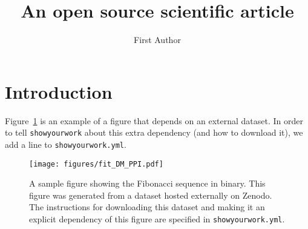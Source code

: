 \documentclass[twocolumn]{aastex631}
\begin{document}
\title{An open source scientific article}

\author{First Author}

\begin{abstract}
    \blindtext
\end{abstract}

\section{Introduction}

Figure~\ref{fig:fit_DM_PPI} is an example of a figure that depends on an external dataset.
In order to tell \texttt{showyourwork} about this extra dependency (and how to download it), we add a line to \texttt{showyourwork.yml}.

\begin{figure}[ht!]
    \begin{centering}
        \texttt{[image: figures/fit\_DM\_PPI.pdf]}
        \caption{
            A sample figure showing the Fibonacci sequence in binary.
            This figure was generated from a dataset hosted externally on Zenodo.
            The instructions for downloading this dataset and making it an explicit dependency of this figure are specified in \texttt{showyourwork.yml}.
        }
        \label{fig:fit_DM_PPI}
    \end{centering}
\end{figure}
\end{document}
